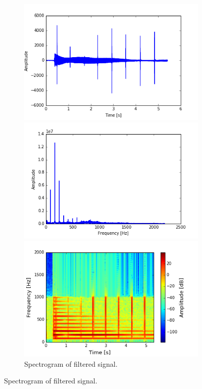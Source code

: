 \begin{figure}[H]
\centering
\begin{subfigure}{0.49\textwidth}
\centering
\includegraphics[width=\textwidth]{figures/validation/integration/signal.png}
\caption{Input signal with noise.}
\label{fig:inte_signal}

\includegraphics[width=\textwidth]{figures/validation/integration/FSIGNAL.png}
\caption{Frequency spectrum of signal with noise.}
\label{fig:inte_SIGNAL}

\includegraphics[width=\textwidth]{figures/validation/integration/spectrogram.png}
\caption{Spectrogram of filtered signal.}
\label{fig:inte_spec}


\end{subfigure}
\end{figure}
